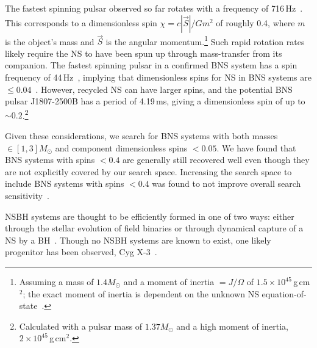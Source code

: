 The fastest spinning pulsar observed so far rotates with a frequency of 716\,Hz~\citep{Hessels:2006ze}. This
corresponds to a dimensionless spin $\chi = c | \vec{S} | / G m^2$ of roughly 0.4, where $m$ is the object's
mass and  $\vec{S}$ is the angular momentum.\footnote{Assuming a mass of $1.4{{M_\odot}}$ and
a moment of inertia $=J/\Omega$ of $1.5\times10^{45}$\,g\,cm$^2$; the exact moment of
inertia is dependent on the unknown \ac{NS} equation-of-state~\citep{Lattimer:2012nd}.} Such
rapid rotation rates likely require the NS to have been spun up through mass-transfer
from its companion. The fastest spinning pulsar in a confirmed \ac{BNS} system has a
spin frequency of 44\,Hz~\citep{Kramer:2009zza}, implying that dimensionless
spins for NS in \ac{BNS} systems are $\leq 0.04$~\citep{Brown:2012qf}. However,
recycled NS can have larger spins, and the potential \ac{BNS} pulsar J1807-2500B
\citep{Lynch:2011aa} has
a period of 4.19\,ms, giving a dimensionless spin of up to
$\sim0.2$.\footnote{Calculated with a pulsar mass of $1.37{{M_\odot}}$ and a
high moment of inertia, $2\times10^{45}$\,g\,cm$^2$.}

Given these considerations, we search for \ac{BNS} systems with both masses
$\in [1,3] M_{\odot}$ and component dimensionless spins $< 0.05$. We have found
that \ac{BNS} systems with spins $< 0.4$ are generally still recovered well even
though they are not explicitly covered by our search space. Increasing the
search space to include \ac{BNS} systems with spins $< 0.4$ was found to
not improve overall search sensitivity~\citep{nitzthesis}.

\ac{NSBH} systems are thought to be efficiently formed in one of two ways: either
through the stellar evolution of field binaries or through dynamical
capture of a \ac{NS} by a \ac{BH}~\citep{Grindlay:2005ym,Sadowski:2007dz,Lee:2009ca,Benacquista:2011kv}.
Though no \ac{NSBH} systems are known to
exist, one likely progenitor has been observed, Cyg
X-3~\citep{Belczynski:2012jc}.

